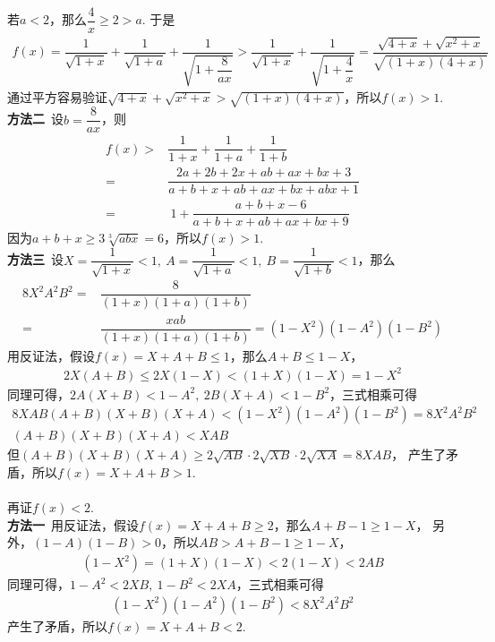 \begin{enumerate}[label={【\textbf{例\thechapter.\arabic*}】},
 leftmargin=\inteval{\myenumleftmargin}pt,
 itemsep=\inteval{\myenumitempsep}pt,
 itemindent=\inteval{\myenumitemindent}pt]
若$ a<2 $，那么$ \dfrac{4}{x}\geq 2>a $.
于是
\begin{align*}
    f(x)=\dfrac{1}{\sqrt{1+x}}+\dfrac{1}{\sqrt{1+a}}+\dfrac{1}{\sqrt{1
            +\dfrac{8}{ax}}} >\dfrac{1}{\sqrt{1+x}}+\dfrac{1}{\sqrt{1+\dfrac{4}{x}}} 
    =\dfrac{\sqrt{4+x}+\sqrt{x^2+x}}{\sqrt{(1+x)(4+x)}} 
\end{align*}
通过平方容易验证$ \sqrt{4+x}+\sqrt{x^2+x}>\sqrt{(1+x)(4+x)} $，所以$ f(x)>1 $.\\
\textbf{方法二}\ 设$ b=\dfrac{8}{ax} $，则
\begin{align*}
    f(x)>&\dfrac{1}{1+x}+\dfrac{1}{1+a}+\dfrac{1}{1+b} \\
    =&\dfrac{2a+2b+2x+ab+ax+bx+3}{a+b+x+ab+ax+bx+abx+1} \\
    =&\ 1+\dfrac{a+b+x-6}{a+b+x+ab+ax+bx+9}
\end{align*}
因为$ a+b+x\geq 3\sqrt[3]{abx}=6 $，所以$ f(x)>1 $. \\
\textbf{方法三}\ 设$ X=\dfrac{1}{\sqrt{1+x}}<1,\ A=\dfrac{1}{\sqrt{1+a}}<1,
\ B=\dfrac{1}{\sqrt{1+b}}<1 $，那么
\begin{align*}
    8X^2A^2B^2=&\dfrac{8}{(1+x)(1+a)(1+b)}\\
    =&\dfrac{xab}{(1+x)(1+a)(1+b)}=(1-X^2)(1-A^2)(1-B^2)
\end{align*}
用反证法，假设$ f(x)=X+A+B\leq 1 $，那么$ A+B\leq 1-X $，
\begin{align*}
    2X(A+B)\leq 2X(1-X)<(1+X)(1-X)=1-X^2
\end{align*}
同理可得，$ 2A(X+B)<1-A^2,\ 2B(X+A)<1-B^2 $，三式相乘可得
\begin{gather*}
    8XAB(A+B)(X+B)(X+A)<(1-X^2)(1-A^2)(1-B^2)=8X^2A^2B^2 \\
    (A+B)(X+B)(X+A)<XAB
\end{gather*}
但$ (A+B)(X+B)(X+A)\geq 2\sqrt{AB}\cdot 2\sqrt{XB}\cdot 2\sqrt{XA}=8XAB $，
产生了矛盾，所以$ f(x)=X+A+B>1 $.\\
\\
再证$ f(x)<2 $. \\
\textbf{方法一}\ 用反证法，假设$ f(x)=X+A+B\geq 2 $，那么$ A+B-1\geq 1-X $，
另外，$ (1-A)(1-B)>0 $，所以$ AB>A+B-1\geq 1-X $，
\begin{align*}
    (1-X^2)=(1+X)(1-X)<2(1-X)<2AB
\end{align*}
同理可得，$ 1-A^2<2XB,\ 1-B^2<2XA $，三式相乘可得
\begin{align*}
    (1-X^2)(1-A^2)(1-B^2)<8X^2A^2B^2
\end{align*}
产生了矛盾，所以$ f(x)=X+A+B<2 $. \\

\end{enumerate}
